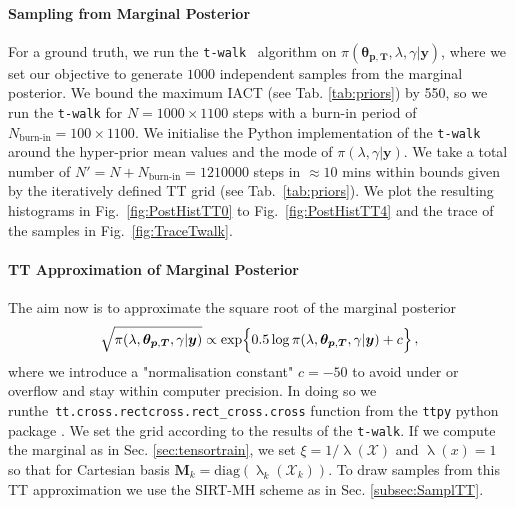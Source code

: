 \paragraph{Sampling from Marginal Posterior}
For a ground truth, we run the \texttt{t-walk}~\cite{christen2010general} algorithm on $\pi( \bm{\theta}_{\bm{p}, \bm{T}},\lambda,\gamma  | \bm{y})$, where we set our objective to generate $1000$ independent samples from the marginal posterior.
We bound the maximum IACT (see Tab. \ref{tab:priors}) by  550, so we run the \texttt{t-walk} for $N = 1000 \times 1100$ steps with a burn-in period of $N_{\text{burn-in}} = 100 \times 1100 $.
We initialise the Python implementation of the \texttt{t-walk}~\cite{christentwalkaccess} around the hyper-prior mean values and the mode of $\pi(\lambda ,\gamma|\bm{y})$.
We take a total number of $N' =N + N_{\text{burn-in}} = 1210000$ steps in $\approx 10$ mins within bounds given by the iteratively defined TT grid (see Tab.~\ref{tab:priors}).
We plot the resulting histograms in Fig.~\ref{fig:PostHistTT0} to Fig.~\ref{fig:PostHistTT4} and the trace of the samples in Fig.~\ref{fig:TraceTwalk}.

\paragraph{TT Approximation of Marginal Posterior}
The aim now is to approximate the square root of the marginal posterior
\begin{align}
	\begin{split}
		\sqrt{\pi( \lambda,\bm{\theta}_{\bm{p}, \bm{T}},\gamma  | \bm{y})} \propto  \exp\Bigl\{ 0.5\log{\pi( \lambda,\bm{\theta}_{\bm{p}, \bm{T}},\gamma  | \bm{y}) } + c \Bigr\}  
	\end{split} \, ,
	\label{eq:MargPostFullTT}
\end{align}
where we introduce a "normalisation constant" $c=-50$ to avoid under or overflow and stay within computer precision.
In doing so we run\linebreak the~\texttt{tt.cross.rectcross.rect\_cross.cross} function from the \texttt{ttpy} python package \cite{Oseledets2018ttpy}.
We set the grid according to the results of the \texttt{t-walk}.
If we compute the marginal as in Sec. \ref{sec:tensortrain}, we set $\xi = 1 / \uplambda (\mathcal{X})$ and $\uplambda(x) = 1$ so that for Cartesian basis $\bm{M}_k = \text{diag}(\uplambda_k(\mathcal{X}_k))$.
To draw samples from this TT approximation we use the SIRT-MH scheme as in Sec. \ref{subsec:SamplTT}.


